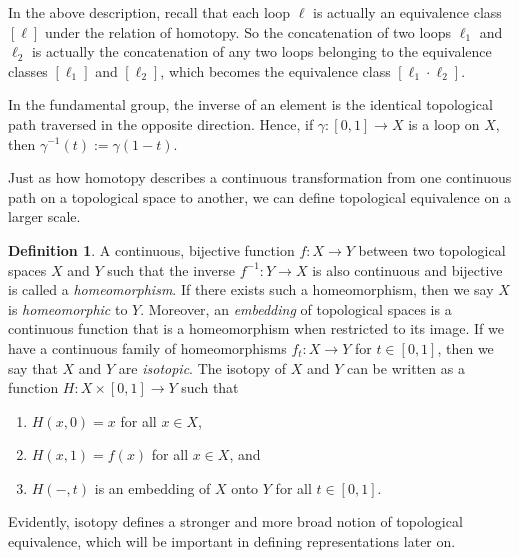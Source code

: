 \documentclass[12pt]{report}
\newcommand{\iv}[1]{{ #1 }^{-1}}
\theoremstyle{definition}
\newtheorem{definition}{Definition}[chapter]
\newtheorem{example}{Example}[chapter]
\begin{document}
In the above description, recall that each loop $\ell$ is actually an equivalence class $\left[ \ell \right]$ under the relation of homotopy. So the concatenation of two loops $\ell_1$ and $\ell_2$ is actually the concatenation of any two loops belonging to the equivalence classes $\left[ \ell_1 \right]$ and $\left[ \ell_2 \right]$, which becomes the equivalence class $\left[ \ell_1\cdot\ell_2 \right]$.

In the fundamental group, the inverse of an element is the identical topological path traversed in the opposite direction. Hence, if $\gamma:[0,1]\to X$ is a loop on $X$, then $\iv{\gamma}(t) := \gamma(1-t)$.


Just as how homotopy describes a continuous transformation from one continuous path on a topological space to another, we can define topological equivalence on a larger scale.
\begin{definition}
    A continuous, bijective function $f:X\to Y$ between two topological spaces $X$ and $Y$ such that the inverse $\iv{f}:Y\to X$ is also continuous and bijective is called a \textit{homeomorphism}. If there exists such a homeomorphism, then we say $X$ is \textit{homeomorphic} to $Y$. Moreover, an \textit{embedding} of topological spaces is a continuous function that is a homeomorphism when restricted to its image. If we have a continuous family of homeomorphisms $f_t:X\to Y$ for $t\in[0,1]$, then we say that $X$ and $Y$ are \textit{isotopic}. The isotopy of $X$ and $Y$ can be written as a function $H:X\times[0,1]\to Y$ such that
    \begin{enumerate}
        \item $H(x,0)=x$ for all $x\in X$, 
        \item $H(x,1)=f(x)$ for all $x\in X$, and
        \item $H(-,t)$ is an embedding of $X$ onto $Y$ for all $t\in[0,1]$.
    \end{enumerate}
\end{definition}
Evidently, isotopy defines a stronger and more broad notion of topological equivalence, which will be important in defining representations later on.
\end{document}
